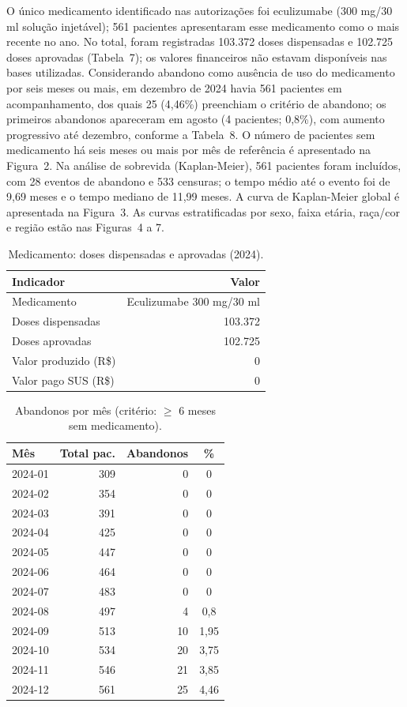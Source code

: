 \documentclass[11pt,a4paper]{article}
\begin{document}
O único medicamento identificado nas autorizações foi eculizumabe (300 mg/30 ml solução injetável); 561 pacientes apresentaram esse medicamento como o mais recente no ano. No total, foram registradas 103.372 doses dispensadas e 102.725 doses aprovadas (Tabela~7); os valores financeiros não estavam disponíveis nas bases utilizadas. Considerando abandono como ausência de uso do medicamento por seis meses ou mais, em dezembro de 2024 havia 561 pacientes em acompanhamento, dos quais 25 (4,46\%) preenchiam o critério de abandono; os primeiros abandonos apareceram em agosto (4 pacientes; 0,8\%), com aumento progressivo até dezembro, conforme a Tabela~8. O número de pacientes sem medicamento há seis meses ou mais por mês de referência é apresentado na Figura~2. Na análise de sobrevida (Kaplan-Meier), 561 pacientes foram incluídos, com 28 eventos de abandono e 533 censuras; o tempo médio até o evento foi de 9,69 meses e o tempo mediano de 11,99 meses. A curva de Kaplan-Meier global é apresentada na Figura~3. As curvas estratificadas por sexo, faixa etária, raça/cor e região estão nas Figuras~4 a 7.

\begin{table}[ht]
\centering
\caption{Medicamento: doses dispensadas e aprovadas (2024).}
\label{tab:7}
\begin{tabular}{lr}
\toprule
\textbf{Indicador} & \textbf{Valor} \\
\midrule
Medicamento & Eculizumabe 300 mg/30 ml \\
Doses dispensadas & 103.372 \\
Doses aprovadas & 102.725 \\
Valor produzido (R\$) & 0 \\
Valor pago SUS (R\$) & 0 \\
\bottomrule
\end{tabular}
\end{table}

\begin{table}[ht]
\centering
\caption{Abandonos por mês (critério: $\geq$ 6 meses sem medicamento).}
\label{tab:8}
\small
\begin{tabular}{lrrc}
\toprule
\textbf{Mês} & \textbf{Total pac.} & \textbf{Abandonos} & \textbf{\%} \\
\midrule
2024-01 & 309 & 0 & 0 \\
2024-02 & 354 & 0 & 0 \\
2024-03 & 391 & 0 & 0 \\
2024-04 & 425 & 0 & 0 \\
2024-05 & 447 & 0 & 0 \\
2024-06 & 464 & 0 & 0 \\
2024-07 & 483 & 0 & 0 \\
2024-08 & 497 & 4 & 0,8 \\
2024-09 & 513 & 10 & 1,95 \\
2024-10 & 534 & 20 & 3,75 \\
2024-11 & 546 & 21 & 3,85 \\
2024-12 & 561 & 25 & 4,46 \\
\bottomrule
\end{tabular}
\end{table}
\end{document}
